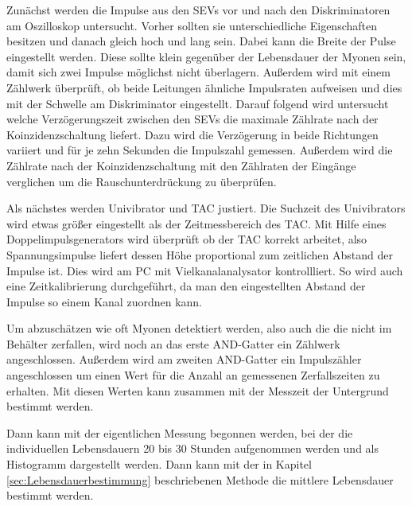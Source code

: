 Zunächst werden die Impulse aus den SEVs vor und nach den Diskriminatoren am Oszilloskop untersucht. Vorher sollten sie unterschiedliche Eigenschaften besitzen und danach gleich hoch und lang sein. Dabei kann die Breite der Pulse eingestellt werden.
Diese sollte klein gegenüber der Lebensdauer der Myonen sein, damit sich zwei Impulse möglichst nicht überlagern.
Außerdem wird mit einem Zählwerk überprüft, ob beide Leitungen ähnliche Impulsraten aufweisen und dies mit der Schwelle am Diskriminator eingestellt. Darauf folgend wird untersucht welche Verzögerungszeit zwischen den SEVs die maximale Zählrate nach der Koinzidenzschaltung liefert. Dazu wird die Verzögerung in beide Richtungen variiert und für je zehn Sekunden die Impulszahl gemessen.
Außerdem wird die Zählrate nach der Koinzidenzschaltung mit den Zählraten der Eingänge verglichen um die Rauschunterdrückung zu überprüfen.

Als nächstes werden Univibrator und TAC justiert. Die Suchzeit des Univibrators wird etwas größer eingestellt als der Zeitmessbereich des TAC. Mit Hilfe eines Doppelimpulsgenerators wird überprüft ob der TAC korrekt arbeitet, also Spannungsimpulse liefert dessen Höhe proportional zum zeitlichen Abstand der Impulse ist. Dies wird am PC mit Vielkanalanalysator kontrollliert. So wird auch eine Zeitkalibrierung durchgeführt, da man den eingestellten Abstand der Impulse so einem Kanal zuordnen kann.

Um abzuschätzen wie oft Myonen detektiert werden, also auch die die nicht im Behälter zerfallen, wird noch an das erste AND-Gatter ein Zählwerk angeschlossen. Außerdem wird am zweiten AND-Gatter ein Impulszähler angeschlossen um einen Wert für die Anzahl an gemessenen Zerfallszeiten zu erhalten. Mit diesen Werten kann zusammen mit der Messzeit der Untergrund bestimmt werden.

Dann kann mit der eigentlichen Messung begonnen werden, bei der die individuellen Lebensdauern \num{20} bis \num{30} Stunden aufgenommen werden und als Histogramm dargestellt werden. Dann kann mit der in Kapitel \ref{sec:Lebensdauerbestimmung} beschriebenen Methode die mittlere Lebensdauer bestimmt werden.
